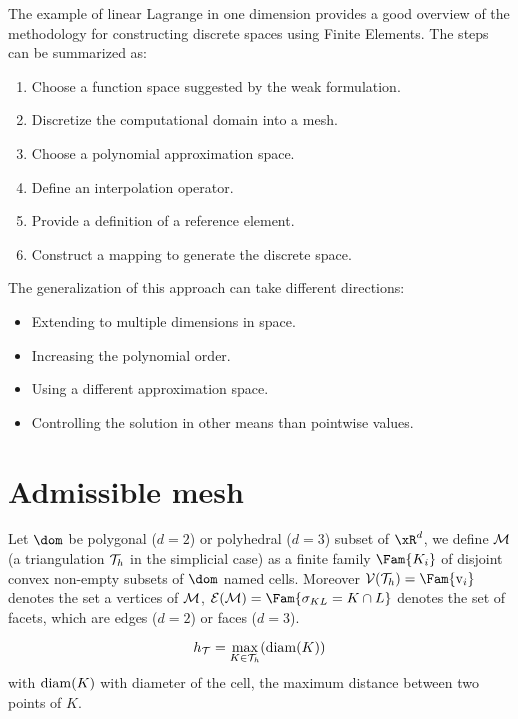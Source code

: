 The example of linear Lagrange in one dimension provides a good overview of the methodology for constructing discrete spaces using Finite Elements.
The steps can be summarized as:
\begin{enumerate}
\item Choose a function space suggested by the weak formulation.
\item Discretize the computational domain into a mesh.
\item Choose a polynomial approximation space.
\item Define an interpolation operator.
\item Provide a definition of a reference element.
\item Construct a mapping to generate the discrete space.
\end{enumerate}
The generalization of this approach can take different directions:
\begin{itemize}
\item Extending to multiple dimensions in space.
\item Increasing the polynomial order.
\item Using a different approximation space.
\item Controlling the solution in other means than pointwise values.
\end{itemize}

\section{Admissible mesh}

\begin{dfntn}[Mesh]
Let $\dom$ be polygonal ($d=2$) or polyhedral ($d=3$) subset of $\xR^d$, we define ${\mathcal M}$ (a triangulation ${\mathcal T}_h$ in the simplicial case) as a finite family $\Fam{K_i}$ of disjoint convex non-empty subsets of $\dom$ named cells.
Moreover $\mathcal \vertices(\meshT) = \Fam{\mathcal \vertex_i}$ denotes the set a vertices of ${\mathcal M}$, $\edges(\disc) = \Fam{\edge_{KL} = K\cap L}$ denotes the set of facets, which are edges ($d =2$) or faces ($d=3$).
\end{dfntn}

\begin{dfntn}
\begin{equation*}
h_{\mathcal T} = \max_{K\in{\mathcal T}_h}({\mathrm{diam}}(K))
\end{equation*}
with ${\mathrm{diam}}(K)$ with diameter of the cell, \ie the maximum distance between two points of $K$.
\end{dfntn}

